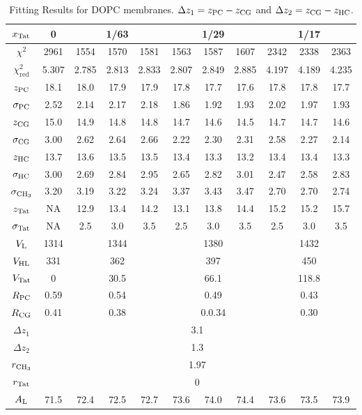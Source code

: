 \begin{table}[htbp]
  \centering
  \begin{tabular}{|c|c|c|c|c|c|c|c|c|c|c|}
    \hline
    $x_\textrm{Tat}$ & 0 & \multicolumn{3}{c|}{1/63} & \multicolumn{3}{c|}{1/29} & \multicolumn{3}{c|}{1/17} \\
    \hline
    $\chi^2$ & 2961 & 1554 & 1570 & 1581 & 1563 & 1587 & 1607 & 2342 & 2338 & 2363 \\ 
    $\chi^2_\textrm{red}$ & 5.307 & 2.785 & 2.813 & 2.833 & 2.807 & 2.849 & 2.885 & 4.197 & 4.189 & 4.235 \\
    \hline
    $z_\textrm{PC}$ & 18.1 & 18.0 & 17.9 & 17.9 & 17.8 & 17.7 & 17.6 & 17.8 & 17.8 & 17.7 \\
    $\sigma_\textrm{PC}$ & 2.52 & 2.14 & 2.17 & 2.18 & 1.86 & 1.92 & 1.93 & 2.02 & 1.97 & 1.93 \\
    $z_\textrm{CG}$ & 15.0 & 14.9 & 14.8 & 14.8 & 14.7 & 14.6 & 14.5 & 14.7 & 14.7 & 14.6 \\
    $\sigma_\textrm{CG}$ & 3.00 & 2.62 & 2.64 & 2.66 & 2.22 & 2.30 & 2.31 & 2.58 & 2.27 & 2.14 \\
    $z_\textrm{HC}$ & 13.7 & 13.6 & 13.5 & 13.5 & 13.4 & 13.3 & 13.2 & 13.4 & 13.4 & 13.3 \\ 
    $\sigma_\textrm{HC}$ & 3.00 & 2.69 & 2.84 & 2.95 & 2.65 & 2.82 & 3.01 & 2.47 & 2.58 & 2.83 \\
    $\sigma_{\textrm{CH}_3}$ & 3.20 & 3.19 & 3.22 & 3.24 & 3.37 & 3.43 & 3.47 & 2.70 & 2.70 & 2.74 \\
    $z_\textrm{Tat}$ & NA & 12.9 & 13.4 & 14.2 & 13.1 & 13.8 & 14.4 & 15.2 & 15.2 & 15.7 \\
    $\sigma_\textrm{Tat}$ & NA & 2.5 & 3.0 & 3.5 & 2.5 & 3.0 & 3.5 & 2.5 & 3.0 & 3.5 \\ 
    \hline
    $V_\textrm{L}$ & 1314 & \multicolumn{3}{c|}{1344} & \multicolumn{3}{c|}{1380} & \multicolumn{3}{c|}{1432} \\ 
    $V_\textrm{HL}$ & 331 & \multicolumn{3}{c|}{362} & \multicolumn{3}{c|}{397} & \multicolumn{3}{c|}{450} \\
    $V_\textrm{Tat}$ & 0 & \multicolumn{3}{c|}{30.5} & \multicolumn{3}{c|}{66.1} & \multicolumn{3}{c|}{118.8} \\
    $R_\textrm{PC}$ & 0.59 & \multicolumn{3}{c|}{0.54} & \multicolumn{3}{c|}{0.49} & \multicolumn{3}{c|}{0.43} \\
    $R_\textrm{CG}$ & 0.41 & \multicolumn{3}{c|}{0.38} & \multicolumn{3}{c|}{0.0.34} & \multicolumn{3}{c|}{0.30} \\
    \hline
    $\Delta z_1$ & \multicolumn{10}{c|}{3.1} \\
    $\Delta z_2$ & \multicolumn{10}{c|}{1.3} \\
    $r_{\textrm{CH}_3}$ & \multicolumn{10}{c|}{1.97} \\
    $r_\textrm{Tat}$ & \multicolumn{10}{c|}{0} \\
    \hline
    $A_\textrm{L}$ & 71.5 & 72.4 & 72.5 & 72.7 & 73.6 & 74.0 & 74.4 & 73.6 & 73.5 & 73.9 \\
    \hline
  \end{tabular}
  \caption{Fitting Results for DOPC membranes. $\Delta z_1 = z_\textrm{PC}-z_\textrm{CG}$
  and $\Delta z_2 = z_\textrm{CG}-z_\textrm{HC}$.}
  \label{tb:DOPC_fit_results}
\end{table}

